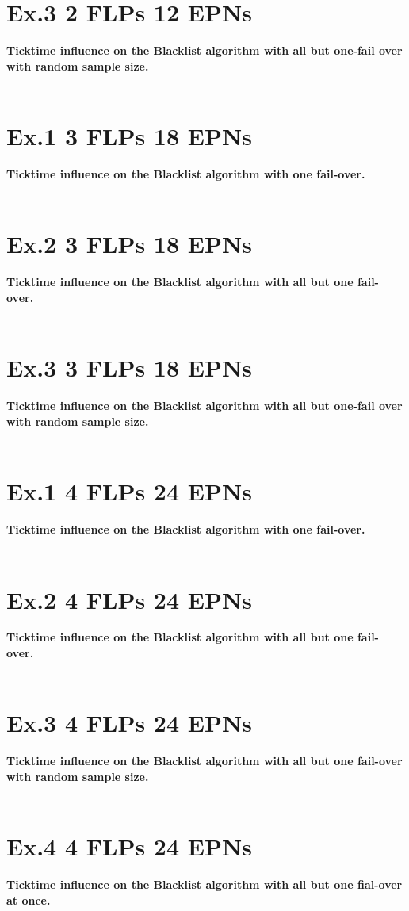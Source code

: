 \section{Ex.3 2 FLPs 12 EPNs}
\textbf{Ticktime influence on the Blacklist algorithm with all but one-fail over with random sample size.}
\\\\

\section{Ex.1 3 FLPs 18 EPNs}
\textbf{Ticktime influence on the Blacklist algorithm with one fail-over.}
\\\\

\section{Ex.2 3 FLPs 18 EPNs}
\textbf{Ticktime influence on the Blacklist algorithm with all but one fail-over.}
\\\\

\section{Ex.3 3 FLPs 18 EPNs}
\textbf{Ticktime influence on the Blacklist algorithm with all but one-fail over with random sample size.}
\\\\

\section{Ex.1 4 FLPs 24 EPNs}
\textbf{Ticktime influence on the Blacklist algorithm with one fail-over.}
\\\\

\section{Ex.2 4 FLPs 24 EPNs}
\textbf{Ticktime influence on the Blacklist algorithm with all but one fail-over.}
\\\\

\section{Ex.3 4 FLPs 24 EPNs}
\textbf{Ticktime influence on the Blacklist algorithm with all but one fail-over with random sample size.}
\\\\

\section{Ex.4 4 FLPs 24 EPNs}
\textbf{Ticktime influence on the Blacklist algorithm with all but one fial-over at once.}